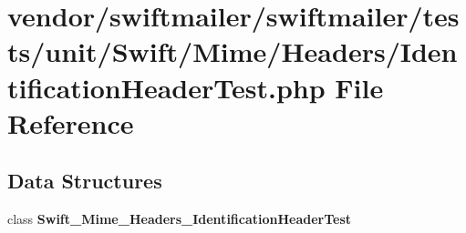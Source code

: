 \section{vendor/swiftmailer/swiftmailer/tests/unit/\+Swift/\+Mime/\+Headers/\+Identification\+Header\+Test.php File Reference}
\label{_identification_header_test_8php}
\subsection*{Data Structures}
\begin{DoxyCompactItemize}
\item 
class {\bf Swift\+\_\+\+Mime\+\_\+\+Headers\+\_\+\+Identification\+Header\+Test}
\end{DoxyCompactItemize}
